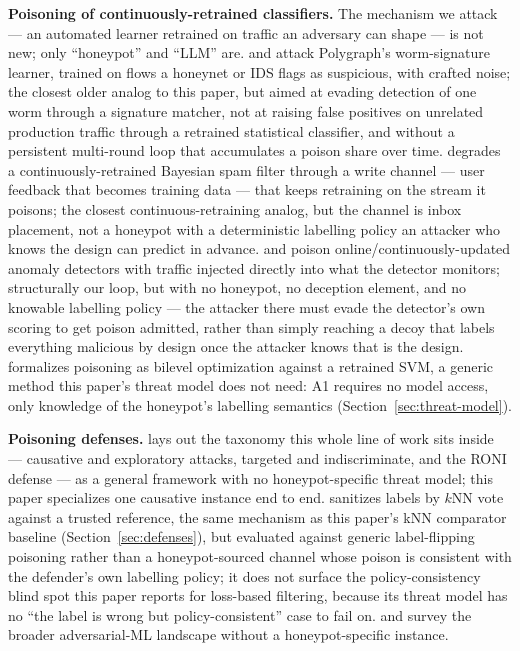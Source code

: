 \textbf{Poisoning of continuously-retrained classifiers.} The mechanism we attack — an automated
learner retrained on traffic an adversary can shape — is not new; only “honeypot” and “LLM” are.
\citet{newsome2006paragraph} and \citet{perdisci2006misleading} attack Polygraph's worm-signature
learner, trained on flows a honeynet or IDS flags as suspicious, with crafted noise; the closest
older analog to this paper, but aimed at evading detection of one worm through a signature
matcher, not at raising false positives on unrelated production traffic through a retrained
statistical classifier, and without a persistent multi-round loop that accumulates a poison
share over time. \citet{nelson2008exploiting} degrades a continuously-retrained Bayesian spam
filter through a write channel — user feedback that becomes training data — that keeps
retraining on the stream it poisons; the closest continuous-retraining analog, but the channel
is inbox placement, not a honeypot with a deterministic labelling policy an attacker who knows
the design can predict in advance. \citet{rubinstein2009antidote} and \citet{kloft2012security}
poison online/continuously-updated anomaly detectors with traffic injected directly into what the
detector monitors; structurally our loop, but with no honeypot, no deception element, and no
knowable labelling policy — the attacker there must evade the detector's own scoring to get
poison admitted, rather than simply reaching a decoy that labels everything malicious by design
once the attacker knows that is the design. \citet{biggio2012poisoning} formalizes poisoning as
bilevel optimization against a retrained SVM, a generic method this paper's threat model does
not need: A1 requires no model access, only knowledge of the honeypot's labelling semantics
(Section~\ref{sec:threat-model}).

\textbf{Poisoning defenses.} \citet{barreno2006can} lays out the taxonomy this whole line of
work sits inside — causative and exploratory attacks, targeted and indiscriminate, and the RONI
defense — as a general framework with no honeypot-specific threat model; this paper specializes
one causative instance end to end. \citet{paudice2018label} sanitizes labels by $k$NN vote
against a trusted reference, the same mechanism as this paper's kNN comparator baseline
(Section~\ref{sec:defenses}), but evaluated against generic label-flipping poisoning rather than
a honeypot-sourced channel whose poison is consistent with the defender's own labelling policy;
it does not surface the policy-consistency blind spot this paper reports for loss-based
filtering, because its threat model has no “the label is wrong but policy-consistent” case to
fail on. \citet{biggio2018wild} and \citet{cina2023wild} survey the broader adversarial-ML
landscape without a honeypot-specific instance.

